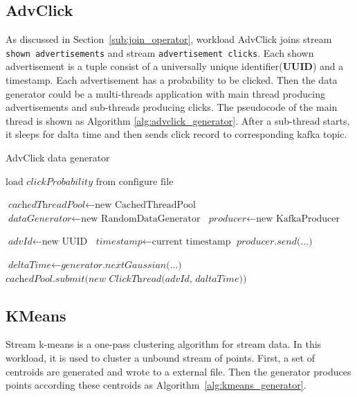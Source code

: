 \subsection{AdvClick}

As discussed in Section~\ref{sub:join_operator}, workload AdvClick joins stream \texttt{shown advertisements} and stream \texttt{advertisement clicks}. Each shown advertisement is a tuple consist of a universally unique identifier(\textbf{UUID}) and a timestamp. Each advertisement has a probability to be clicked. Then the data generator could be a multi-threads application with main thread producing advertisements and sub-threads producing clicks. The pseudocode of the main thread is shown as Algorithm \ref{alg:advclick_generator}. After a sub-thread starts, it sleeps for dalta time and then sends click record to corresponding kafka topic. 

\begin{algorithm}
\caption{AdvClick data generator}\label{euclid}
\label{alg:advclick_generator}
\begin{algorithmic}[1]
\State $\text{load } \textit{clickProbability} \text{ from configure file}$

\State $\textit{cachedThreadPool} \gets \text{new CachedThreadPool}$
\State $\textit{dataGenerator} \gets \text{new RandomDataGenerator}$ 
\State $\textit{producer} \gets \text{new KafkaProducer}$ 

\State $\textit{advId} \gets \text{new UUID}$ 
\State $\textit{timestamp} \gets \text{current timestamp}$ 
\State $\textit{producer.send(...)}$ 

\State $\textit{deltaTime} \gets \textit{generator.nextGaussian(...)}$ 
\State $\textit{cachedPool.submit(new ClickThread(advId, daltaTime))} $ 
\EndIf
\EndWhile
\end{algorithmic}
\end{algorithm}

\subsection{KMeans}

Stream k-means is a one-pass clustering algorithm for stream data. In this workload, it is used to cluster a unbound stream of points. First, a set of centroids are generated and wrote to a external file. Then the generator produces points according these centroids as Algorithm~\ref{alg:kmeans_generator}.

